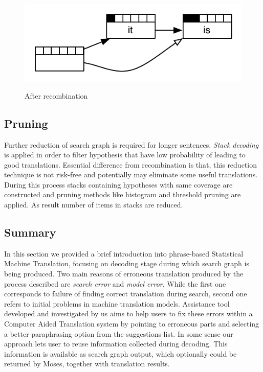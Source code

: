 \begin{figure}
 \centering 
 \includegraphics{g/recombination-example2.pdf}
 \caption{After recombination}
 \caption*{\textit{\cite{Koehn2009a}}}
\end{figure}


\subsection{Pruning}

Further reduction of search graph is required for longer sentences. \textit{Stack decoding} is applied in order to filter hypothesis that have low probability of leading to good translations. Essential difference from recombination is that, this reduction technique is not risk-free and potentially may eliminate some useful translations. During this process stacks containing hypotheses with same coverage are constructed and pruning methods like histogram and threshold pruning are applied. As result number of items in stacks are reduced. 

\subsection{Summary}

In this section we provided a brief introduction into phrase-based Statistical Machine Translation, focusing on decoding stage during which search graph is being produced. Two main reasons of erroneous translation produced by the process described are \textit{search error} and \textit{model error}. While the first one corresponds to failure of finding correct translation during search, second one refers to initial problems in machine translation models. Assistance tool developed and investigated by us aims to help users to fix these errors within a Computer Aided Translation system by pointing to erroneous parts and selecting a better paraphrasing option from the suggestions list. In some sense our approach lets user to reuse information collected during decoding. This information is available as search graph output, which optionally could be returned by Moses, together with translation results. 
